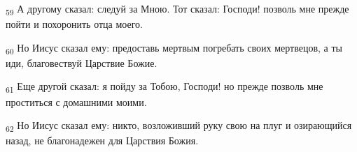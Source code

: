 \begin{tcolorbox}
\textsubscript{59} А другому сказал: следуй за Мною. Тот сказал: Господи! позволь мне прежде пойти и похоронить отца моего.
\end{tcolorbox}
\begin{tcolorbox}
\textsubscript{60} Но Иисус сказал ему: предоставь мертвым погребать своих мертвецов, а ты иди, благовествуй Царствие Божие.
\end{tcolorbox}
\begin{tcolorbox}
\textsubscript{61} Еще другой сказал: я пойду за Тобою, Господи! но прежде позволь мне проститься с домашними моими.
\end{tcolorbox}
\begin{tcolorbox}
\textsubscript{62} Но Иисус сказал ему: никто, возложивший руку свою на плуг и озирающийся назад, не благонадежен для Царствия Божия.
\end{tcolorbox}
